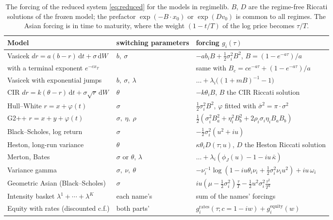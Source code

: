 \documentclass[11pt]{article}
\theoremstyle{remark}
\newcommand{\dd}{\,\mathrm{d}}
\newcommand{\rl}{\textsf{regimelib}}
\begin{document}
\begin{table}[t]
\centering\footnotesize
\begin{tabular}{lll}\toprule
Model & switching parameters & forcing $g_i(\tau)$ \\\midrule
Vasicek $dr = a(b - r)\dd t + \sigma \dd W$ & $b,\ \sigma$ & $-a b_i B + \tfrac12 \sigma_i^2 B^2$, $B = (1-e^{-a\tau})/a$ \\
\quad with a terminal exponent $e^{-cx_T}$ & & same with $B_c = c e^{-a\tau} + (1 - e^{-a\tau})/a$ \\
Vasicek with exponential jumps & $b,\ \sigma,\ \lambda$ & $\ldots + \lambda_i\big((1 + mB)^{-1} - 1\big)$ \\
CIR $dr = k(\theta - r)\dd t + \sigma\sqrt r \dd W$ & $\theta$ & $-k\theta_i B$, $B$ the CIR Riccati solution \\
Hull--White $r = x + \varphi(t)$ & $\sigma$ & $\tfrac12\sigma_i^2 B^2$, $\varphi$ fitted with $\bar\sigma^2 = \pi\cdot\sigma^2$ \\
G2++ $r = x + y + \varphi(t)$ & $\sigma,\ \eta,\ \rho$ & $\tfrac12(\sigma_i^2 B_a^2 + \eta_i^2 B_b^2 + 2\rho_i\sigma_i\eta_i B_a B_b)$ \\
Black--Scholes, log return & $\sigma$ & $-\tfrac12\sigma_i^2 (u^2 + iu)$ \\
Heston, long-run variance & $\theta$ & $\kappa\theta_i D(\tau;u)$, $D$ the Heston Riccati solution \\
Merton, Bates & $\sigma$ or $\theta$, $\lambda$ & $\ldots + \lambda_i(\phi_J(u) - 1 - iu\,\bar\kappa)$ \\
Variance gamma & $\sigma,\ \nu,\ \theta$ & $-\nu_i^{-1}\log(1 - iu\theta_i\nu_i + \tfrac12\sigma_i^2\nu_i u^2) + iu\,\omega_i$ \\
Geometric Asian (Black--Scholes) & $\sigma$ & $iu(\mu - \tfrac12\sigma_i^2)\tfrac{\tau}{T} - \tfrac12 u^2\sigma_i^2 \tfrac{\tau^2}{T^2}$ \\
Intensity basket $\lambda^1 + \cdots + \lambda^K$ & each name's & sum of the names' forcings \\
Equity with rates (discounted c.f.) & both parts' & $g^{\text{rates}}_i(\tau; c = 1 - iw) + g^{\text{equity}}_i(w)$ \\
\bottomrule
\end{tabular}
\caption{The forcing of the reduced system \eqref{eq:reduced} for the models in \rl{}. $B$, $D$ are the
regime-free Riccati solutions of the frozen model; the prefactor $\exp(-B\cdot x_0)$ or $\exp(D v_0)$ is common to
all regimes. The Asian forcing is in time to maturity, where the weight $(1 - t/T)$ of the log price becomes
$\tau/T$.}
\label{tab:forcing}
\end{table}
\end{document}
